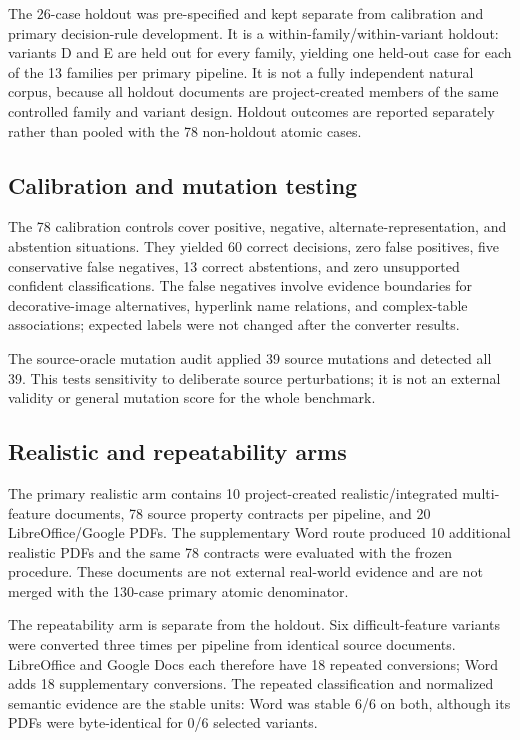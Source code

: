 The 26-case holdout was pre-specified and kept separate from calibration and primary decision-rule development. It is a within-family/within-variant holdout: variants D and E are held out for every family, yielding one held-out case for each of the 13 families per primary pipeline. It is not a fully independent natural corpus, because all holdout documents are project-created members of the same controlled family and variant design. Holdout outcomes are reported separately rather than pooled with the 78 non-holdout atomic cases.

\subsection{Calibration and mutation testing}
The 78 calibration controls cover positive, negative, alternate-representation, and abstention situations. They yielded 60 correct decisions, zero false positives, five conservative false negatives, 13 correct abstentions, and zero unsupported confident classifications. The false negatives involve evidence boundaries for decorative-image alternatives, hyperlink name relations, and complex-table associations; expected labels were not changed after the converter results.

The source-oracle mutation audit applied 39 source mutations and detected all 39. This tests sensitivity to deliberate source perturbations; it is not an external validity or general mutation score for the whole benchmark.

\subsection{Realistic and repeatability arms}
The primary realistic arm contains 10 project-created realistic/integrated multi-feature documents, 78 source property contracts per pipeline, and 20 LibreOffice/Google PDFs. The supplementary Word route produced 10 additional realistic PDFs and the same 78 contracts were evaluated with the frozen procedure. These documents are not external real-world evidence and are not merged with the 130-case primary atomic denominator.

The repeatability arm is separate from the holdout. Six difficult-feature variants were converted three times per pipeline from identical source documents. LibreOffice and Google Docs each therefore have 18 repeated conversions; Word adds 18 supplementary conversions. The repeated classification and normalized semantic evidence are the stable units: Word was stable 6/6 on both, although its PDFs were byte-identical for 0/6 selected variants.
